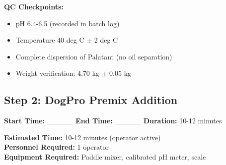 \textbf{QC Checkpoints:}
\begin{itemize}
\item pH 6.4-6.5 (recorded in batch log)
\item Temperature 40 deg C $\pm$ 2 deg C
\item Complete dispersion of Palatant (no oil separation)
\item Weight verification: 4.70 kg $\pm$ 0.05 kg
\end{itemize}


\subsection*{Step 2: DogPro Premix Addition}

\textbf{Start Time:} \_\_\_\_\_ \hspace{1cm} \textbf{End Time:} \_\_\_\_\_ \hspace{1cm} \textbf{Duration:} 10-12 minutes

\vspace{0.5em}

\textbf{Estimated Time:} 10-12 minutes (operator active) \\
\textbf{Personnel Required:} 1 operator \\
\textbf{Equipment Required:} Paddle mixer, calibrated pH meter, scale

\vspace{0.5em}

